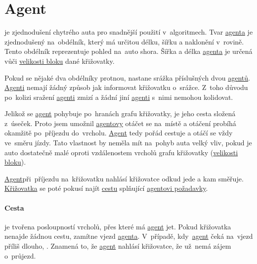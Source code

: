\section{Agent}\label{sec:agent}



 je zjednodušení chytrého auta pro snadnější použití v~algoritmech.
Tvar \hyperref[sec:agent]{agenta} je zjednodušený na~obdélník, který má určitou délku, šířku a naklonění v~rovině.
Tento obdélník reprezentuje pohled na~auto shora.
Šířka a délka \hyperref[sec:agent]{agenta} je určená vůči \hyperref[par:velikost_bloku]{velikosti bloku} dané křižovatky.

Pokud se nějaké dva obdélníky protnou, nastane srážka příslušných dvou \hyperref[sec:agent]{agentů}.
\hyperref[sec:agent]{Agenti} nemají žádný způsob jak informovat křižovatku o~srážce.
Z~toho důvodu po~kolizi sražení \hyperref[sec:agent]{agenti} zmizí a žádní jiní \hyperref[sec:agent]{agenti} s~nimi nemohou kolidovat.

Jelikož se \hyperref[sec:agent]{agent} pohybuje po~hranách grafu křižovatky, je jeho cesta složená z~úseček.
Proto jsem umožnil \hyperref[sec:agent]{agentovy} otáčet se na~místě a otáčení probíhá okamžitě po~příjezdu do~vrcholu.
\hyperref[sec:agent]{Agent} tedy pořád cestuje a otáčí se vždy ve~směru jízdy.
Tato vlastnost by neměla mít na~pohyb auta velký vliv, pokud je auto dostatečně malé
oproti vzdálenostem vrcholů grafu křižovatky (\hyperref[par:velikost_bloku]{velikosti bloku}).

\hyperref[sec:agent]{Agent}při~příjezdu na~křižovatku nahlásí křižovatce odkud jede a kam směřuje.
\hyperref[sec:krizovatka]{Křižovatka} se poté pokusí najít \hyperref[par:cesta]{cestu} splňující \hyperref[sec:agent]{agentovi požadavky}.

\paragraph{Cesta}\label{par:cesta} je tvořena posloupností vrcholů, přes které má \hyperref[sec:agent]{agent} jet.
Pokud křižovatka nenajde žádnou cestu, zamítne vjezd \hyperref[sec:agent]{agenta}.
V~případě, kdy~\hyperref[sec:agent]{agent} čeká na~vjezd příliš dlouho,
.
Znamená to, že \hyperref[sec:agent]{agent} nahlásí křižovatce, že už~nemá zájem o~průjezd.

